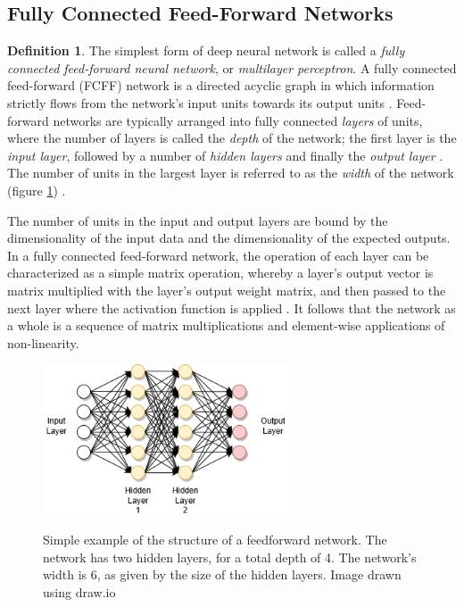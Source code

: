 \documentclass[12pt, titlepage]{report}
\theoremstyle{definition}
\newtheorem{definition}{Definition}
\begin{document}
\subsection{Fully Connected Feed-Forward Networks}
\begin{definition}
The simplest form of deep neural network is called a \emph{fully connected feed-forward neural network}, or \emph{multilayer perceptron}. A fully connected feed-forward (FCFF) network is a directed acyclic graph in which information strictly flows from the network's input units towards its output units \cite[p. 164]{goodfellow2016deep}. Feed-forward networks are typically arranged into fully connected \emph{layers} of units, where the number of layers is called the \emph{depth} of the network; the first layer is the \emph{input layer}, followed by a number of \emph{hidden layers} and finally the \emph{output layer} \cite[p. 164-165]{goodfellow2016deep}. The number of units in the largest layer is referred to as the \emph{width} of the network (figure \ref{figure:feedforward}) \cite[p. 164-165]{goodfellow2016deep}.
\end{definition}

The number of units in the input and output layers are bound by the dimensionality of the input data and the dimensionality of the expected outputs. In a fully connected feed-forward network, the operation of each layer can be characterized as a simple matrix operation, whereby a layer's output vector is matrix multiplied with the layer's output weight matrix, and then passed to the next layer where the activation function is applied \cite[p. 170-171]{goodfellow2016deep}. It follows that the network as a whole is a sequence of matrix multiplications and element-wise applications of non-linearity.

\begin{figure}
\centering
\includegraphics[width=0.65\textwidth]{img/feedforward_nn.png}\\
\caption[Fully connected feed-forward architecture]{Simple example of the structure of a feedforward network. The network has two hidden layers, for a total depth of 4. The network's width is 6, as given by the size of the hidden layers. Image drawn using draw.io \cite{jgraph2018draw}}
\label{figure:feedforward}
\end{figure}
\end{document}

